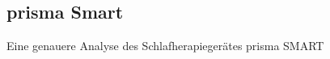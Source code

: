 \documentclass[a4paper, 12pt]{article}
\begin{document}

\newpage

\subsection{prisma Smart}\label{prismaSmart}
Eine genauere Analyse des Schlafherapiegerätes prisma SMART
\end{document}
